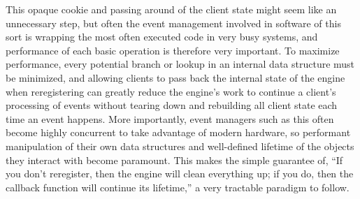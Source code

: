 This opaque cookie and passing around of the client state might seem
like an unnecessary step, but often the event management involved in
software of this sort is wrapping the most often executed code in very
busy systems, and performance of each basic operation is therefore very
important. To maximize performance, every potential branch or lookup in
an internal data structure must be minimized, and allowing clients to
pass back the internal state of the engine when reregistering can
greatly reduce the engine's work to continue a client's processing of
events without tearing down and rebuilding all client state each time an
event happens. More importantly, event managers such as this often
become highly concurrent to take advantage of modern hardware, so
performant manipulation of their own data structures and well-defined
lifetime of the objects they interact with become paramount. This makes
the simple guarantee of, ``If you don't reregister, then the engine will
clean everything up; if you do, then the callback function will continue
its lifetime,'' a very tractable paradigm to follow.

